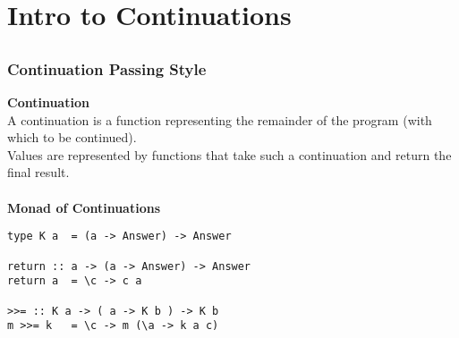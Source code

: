 \documentclass{beamer}
\newcommand{\bind}{\texttt{>>=}}
\begin{document}
\section{Intro to Continuations}
\subsection{} 
\begin{frame}[fragile]
\frametitle{Continuation Passing Style}

\textbf{Continuation}\\
A continuation is a function representing the remainder of the program (with which to be continued). \\
Values are represented by functions that take such a continuation and return the final result. \\\ \\ 
\pause
\textbf{Monad of Continuations}
\begin{lstlisting}
type K a  = (a -> Answer) -> Answer

return :: a -> (a -> Answer) -> Answer
return a  = \c -> c a

>>= :: K a -> ( a -> K b ) -> K b
m >>= k   = \c -> m (\a -> k a c)
\end{lstlisting}

 
 
\end{frame}


\end{document}
